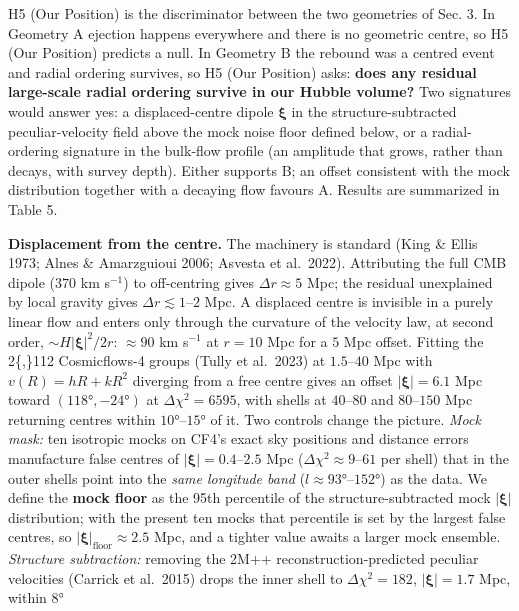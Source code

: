 \documentclass[
]{article}
\begin{document}
H5 (Our Position) is the discriminator between the two geometries of
Sec. 3. In Geometry A ejection happens everywhere and there is no
geometric centre, so H5 (Our Position) predicts a null. In Geometry B
the rebound was a centred event and radial ordering survives, so H5 (Our
Position) asks: \textbf{does any residual large-scale radial ordering
survive in our Hubble volume?} Two signatures would answer yes: a
displaced-centre dipole \(\boldsymbol{\xi}\) in the structure-subtracted
peculiar-velocity field above the mock noise floor defined below, or a
radial-ordering signature in the bulk-flow profile (an amplitude that
grows, rather than decays, with survey depth). Either supports B; an
offset consistent with the mock distribution together with a decaying
flow favours A. Results are summarized in Table 5.

\textbf{Displacement from the centre.} The machinery is standard (King
\& Ellis 1973; Alnes \& Amarzguioui 2006; Asvesta et al.~2022).
Attributing the full CMB dipole (\(370\) km s\(^{-1}\)) to off-centring
gives \(\Delta r \approx 5\) Mpc; the residual unexplained by local
gravity gives \(\Delta r \lesssim 1\)--\(2\) Mpc. A displaced centre is
invisible in a purely linear flow and enters only through the curvature
of the velocity law, at second order, \(\sim H|\boldsymbol{\xi}|^2/2r\):
\(\approx 90\) km s\(^{-1}\) at \(r = 10\) Mpc for a \(5\) Mpc offset.
Fitting the 2\{,\}112 Cosmicflows-4 groups (Tully et al.~2023) at
\(1.5\)--\(40\) Mpc with \(v(R) = hR + kR^2\) diverging from a free
centre gives an offset \(|\boldsymbol{\xi}| = 6.1\) Mpc toward
\((118°, -24°)\) at \(\Delta\chi^2 = 6595\), with shells at
\(40\)--\(80\) and \(80\)--\(150\) Mpc returning centres within
\(10°\)--\(15°\) of it. Two controls change the picture. \emph{Mock
mask:} ten isotropic mocks on CF4's exact sky positions and distance
errors manufacture false centres of
\(|\boldsymbol{\xi}| = 0.4\)--\(2.5\) Mpc
(\(\Delta\chi^2 \approx 9\)--\(61\) per shell) that in the outer shells
point into the \emph{same longitude band} (\(l \approx 93°\)--\(152°\))
as the data. We define the \textbf{mock floor} as the 95th percentile of
the structure-subtracted mock \(|\boldsymbol{\xi}|\) distribution; with
the present ten mocks that percentile is set by the largest false
centres, so \(|\boldsymbol{\xi}|_{\text{floor}} \approx 2.5\) Mpc, and a
tighter value awaits a larger mock ensemble. \emph{Structure
subtraction:} removing the 2M++ reconstruction-predicted peculiar
velocities (Carrick et al.~2015) drops the inner shell to
\(\Delta\chi^2 = 182\), \(|\boldsymbol{\xi}| = 1.7\) Mpc, within \(8°\)
\end{document}
